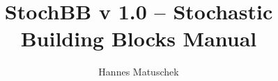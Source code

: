 \documentclass[a4paper, 11pt]{paper}
\title{StochBB v 1.0 -- Stochastic Building Blocks Manual}
\author{Hannes Matuschek}
\begin{document}
\maketitle
\begin{abstract}
 
\end{abstract}



\newpage


	





\newpage
\appendix

\end{document}
